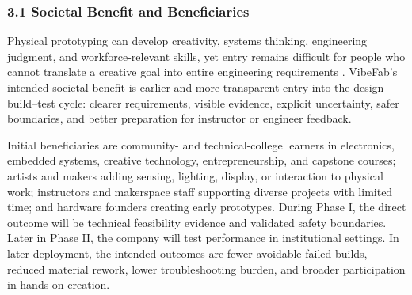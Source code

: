 \documentclass[11pt,letterpaper]{article}
\begin{document}

\subsubsection*{3.1 Societal Benefit and Beneficiaries}
Physical prototyping can develop creativity, systems thinking, engineering judgment, and workforce-relevant skills, yet entry remains difficult for people who cannot translate a creative goal into entire engineering requirements \cite{guthaus2023icworkforce,papagiannis2024makerspace,alvarez2024physicalcomputing}. VibeFab's intended societal benefit 
is earlier and more transparent entry into the design--build--test cycle: clearer requirements, visible evidence, explicit uncertainty, safer boundaries, and better preparation for instructor or engineer feedback.

Initial beneficiaries are community- and technical-college learners in electronics, embedded systems, creative technology, entrepreneurship, and capstone courses; artists and makers adding sensing, lighting, display, or interaction to physical work; instructors and makerspace staff supporting diverse projects with limited time; and hardware founders creating early prototypes. During Phase I, the direct outcome will be technical feasibility evidence and validated safety boundaries. Later in Phase II, the company will test performance in institutional settings. In later deployment, the intended outcomes are fewer avoidable failed builds, reduced material rework, lower troubleshooting burden, and broader participation in hands-on creation.
\end{document}
